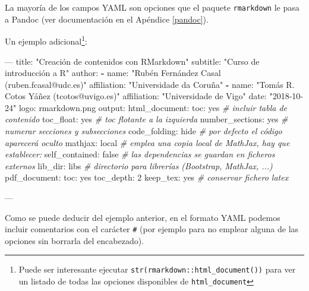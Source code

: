 \documentclass[]{book}
\newenvironment{Shaded}{\begin{snugshade}}{\end{snugshade}}
\newcommand{\KeywordTok}[1]{\textcolor[rgb]{0.13,0.29,0.53}{\textbf{#1}}}
\newcommand{\StringTok}[1]{\textcolor[rgb]{0.31,0.60,0.02}{#1}}
\newcommand{\CommentTok}[1]{\textcolor[rgb]{0.56,0.35,0.01}{\textit{#1}}}
\newcommand{\OtherTok}[1]{\textcolor[rgb]{0.56,0.35,0.01}{#1}}
\newcommand{\FunctionTok}[1]{\textcolor[rgb]{0.00,0.00,0.00}{#1}}
\newcommand{\AttributeTok}[1]{\textcolor[rgb]{0.77,0.63,0.00}{#1}}
\let\rmarkdownfootnote\footnote%
\def\footnote{\protect\rmarkdownfootnote}
\theoremstyle{definition}
\theoremstyle{definition}
\theoremstyle{definition}
\theoremstyle{remark}
\begin{document}
La mayoría de los campos YAML son opciones que el paquete
\texttt{rmarkdown} le pasa a Pandoc (ver documentación en el Apéndice
\ref{pandoc}).

Un ejemplo adicional\footnote{Puede ser interesante ejecutar
  \texttt{str(rmarkdown::html\_document())} para ver un listado de todas
  las opciones disponibles de \texttt{html\_document}}:

\begin{Shaded}
\begin{Highlighting}[]
\OtherTok{---}
\FunctionTok{title:}\AttributeTok{ }\StringTok{"Creación de contenidos con RMarkdown"}
\FunctionTok{subtitle:}\AttributeTok{ }\StringTok{"Curso de introducción a R"}
\FunctionTok{author:}
\KeywordTok{-} \FunctionTok{name:}\AttributeTok{ }\StringTok{"Rubén Fernández Casal (ruben.fcasal@udc.es)"}
  \FunctionTok{affiliation:}\AttributeTok{ }\StringTok{"Universidade da Coruña"}
\KeywordTok{-} \FunctionTok{name:}\AttributeTok{ }\StringTok{"Tomás R. Cotos Yáñez (tcotos@uvigo.es)"}
  \FunctionTok{affiliation:}\AttributeTok{ }\StringTok{"Universidade de Vigo"}
\FunctionTok{date:}\AttributeTok{ }\StringTok{"2018-10-24"}
\FunctionTok{logo:}\AttributeTok{ rmarkdown.png}
\FunctionTok{output:}
  \FunctionTok{html_document:}
    \FunctionTok{toc:}\AttributeTok{ yes                  }\CommentTok{# incluir tabla de contenido}
    \FunctionTok{toc_float:}\AttributeTok{ yes            }\CommentTok{# toc flotante a la izquierda}
    \FunctionTok{number_sections:}\AttributeTok{ yes      }\CommentTok{# numerar secciones y subsecciones}
    \FunctionTok{code_folding:}\AttributeTok{ hide        }\CommentTok{# por defecto el código aparecerá oculto}
    \FunctionTok{mathjax:}\AttributeTok{ local            }\CommentTok{# emplea una copia local de MathJax, hay que establecer:}
    \FunctionTok{self_contained:}\AttributeTok{ false     }\CommentTok{# las dependencias se guardan en ficheros externos}
    \FunctionTok{lib_dir:}\AttributeTok{ libs             }\CommentTok{# directorio para librerías (Bootstrap, MathJax, ...)}
  \FunctionTok{pdf_document:}
    \FunctionTok{toc:}\AttributeTok{ yes}
    \FunctionTok{toc_depth:}\AttributeTok{ 2}
    \FunctionTok{keep_tex:}\AttributeTok{ yes             }\CommentTok{# conservar fichero latex}
    
\OtherTok{---}
\end{Highlighting}
\end{Shaded}

Como se puede deducir del ejemplo anterior, en el formato YAML podemos
incluir comentarios con el carácter \texttt{\#} (por ejemplo para no
emplear alguna de las opciones sin borrarla del encabezado).
\end{document}
